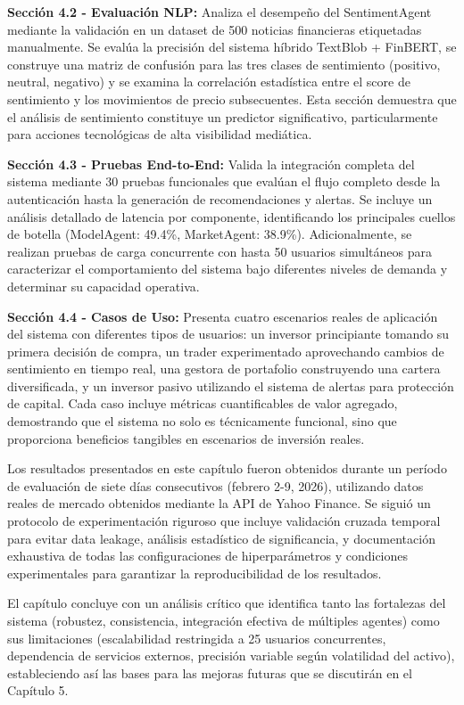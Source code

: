 \documentclass[12pt,a4paper]{report}
\begin{document}
\textbf{Sección 4.2 - Evaluación NLP:} Analiza el desempeño del SentimentAgent mediante la validación en un dataset de 500 noticias financieras etiquetadas manualmente. Se evalúa la precisión del sistema híbrido TextBlob + FinBERT, se construye una matriz de confusión para las tres clases de sentimiento (positivo, neutral, negativo) y se examina la correlación estadística entre el score de sentimiento y los movimientos de precio subsecuentes. Esta sección demuestra que el análisis de sentimiento constituye un predictor significativo, particularmente para acciones tecnológicas de alta visibilidad mediática.

\textbf{Sección 4.3 - Pruebas End-to-End:} Valida la integración completa del sistema mediante 30 pruebas funcionales que evalúan el flujo completo desde la autenticación hasta la generación de recomendaciones y alertas. Se incluye un análisis detallado de latencia por componente, identificando los principales cuellos de botella (ModelAgent: 49.4\%, MarketAgent: 38.9\%). Adicionalmente, se realizan pruebas de carga concurrente con hasta 50 usuarios simultáneos para caracterizar el comportamiento del sistema bajo diferentes niveles de demanda y determinar su capacidad operativa.

\textbf{Sección 4.4 - Casos de Uso:} Presenta cuatro escenarios reales de aplicación del sistema con diferentes tipos de usuarios: un inversor principiante tomando su primera decisión de compra, un trader experimentado aprovechando cambios de sentimiento en tiempo real, una gestora de portafolio construyendo una cartera diversificada, y un inversor pasivo utilizando el sistema de alertas para protección de capital. Cada caso incluye métricas cuantificables de valor agregado, demostrando que el sistema no solo es técnicamente funcional, sino que proporciona beneficios tangibles en escenarios de inversión reales.

Los resultados presentados en este capítulo fueron obtenidos durante un período de evaluación de siete días consecutivos (febrero 2-9, 2026), utilizando datos reales de mercado obtenidos mediante la API de Yahoo Finance. Se siguió un protocolo de experimentación riguroso que incluye validación cruzada temporal para evitar data leakage, análisis estadístico de significancia, y documentación exhaustiva de todas las configuraciones de hiperparámetros y condiciones experimentales para garantizar la reproducibilidad de los resultados.

El capítulo concluye con un análisis crítico que identifica tanto las fortalezas del sistema (robustez, consistencia, integración efectiva de múltiples agentes) como sus limitaciones (escalabilidad restringida a 25 usuarios concurrentes, dependencia de servicios externos, precisión variable según volatilidad del activo), estableciendo así las bases para las mejoras futuras que se discutirán en el Capítulo 5.
\end{document}
